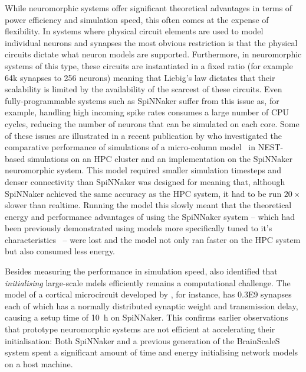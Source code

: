 \documentclass[utf8]{frontiersSCNS} %
\begin{document}
While neuromorphic systems offer significant theoretical advantages in terms of power efficiency and simulation speed, this often comes at the expense of flexibility.
In systems where physical circuit elements are used to model individual neurons and synapses the most obvious restriction is that the physical circuits dictate what neuron models are supported.
Furthermore, in neuromorphic systems of this type, these circuits are instantiated in a fixed ratio (for example 64k synapses to 256 neurons) meaning that Liebig's law dictates that their scalability is limited by the availability of the scarcest of these circuits.
Even fully-programmable systems such as SpiNNaker suffer from this issue as, for example, handling high incoming spike rates consumes a large number of CPU cycles, reducing the number of neurons that can be simulated on each core.
Some of these issues are illustrated in a recent publication by \citet{VanAlbada2018} who investigated the comparative performance of simulations of a micro-column model~\citep{Potjans2012} in NEST-based simulations on an HPC cluster and an implementation on the SpiNNaker neuromorphic system.
This model required smaller simulation timesteps and denser connectivity than SpiNNaker was designed for meaning that, although SpiNNaker achieved the same accuracy as the HPC system, it had to be run $20\times$ slower than realtime. 
Running the model this slowly meant that the theoretical energy and performance advantages of using the SpiNNaker system -- which had been previously demonstrated using models more specifically tuned to it's characteristics~\citep{Sharp2012,Sharp2014,Knight2016} -- were lost and the model not only ran faster on the HPC system but also consumed less energy.

Besides measuring the performance in simulation speed, \citet{VanAlbada2018} also identified that \textit{initialising} large-scale mdels efficiently remains a computational challenge. 
The model of a cortical microcircuit developed by \citet{Potjans2012}, for instance, has \num{0.3E9} synapses each of which has a normally distributed synaptic weight and transmission delay, causing a setup time of \SI{10}{\hour} on SpiNNaker.
This confirms earlier observations~\citep{Diamond2018} that prototype neuromorphic systems are not efficient at accelerating their initialisation: Both SpiNNaker and a previous generation of the BrainScaleS system spent a significant amount of time and energy initialising network models on a host machine. 
\end{document}
